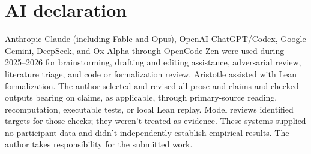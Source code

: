 \documentclass[12pt,letterpaper]{article}
\begin{document}
\section*{AI declaration}
Anthropic Claude (including Fable and Opus), OpenAI ChatGPT/Codex, Google Gemini,
DeepSeek, and Ox Alpha through OpenCode Zen were used during 2025--2026 for
brainstorming, drafting and editing assistance, adversarial review, literature
triage, and code or formalization review. Aristotle assisted with Lean
formalization. The author selected and revised all prose and claims and checked
outputs bearing on claims, as applicable, through primary-source reading,
recomputation, executable tests, or local Lean replay. Model reviews identified
targets for those checks; they weren't treated as evidence. These systems supplied
no participant data and didn't independently establish empirical results. The author
takes responsibility for the submitted work.

\clearpage
\begin{sloppypar}
\printbibliography[title=References]
\end{sloppypar}
\end{document}
